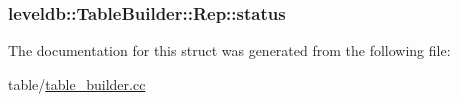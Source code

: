 \subsubsection[{status}]{ leveldb\+::\+Table\+Builder\+::\+Rep\+::status}\label{structleveldb_1_1_table_builder_1_1_rep_a8345f0a97587121457fb180a1fb081dd}


The documentation for this struct was generated from the following file\+:\begin{DoxyCompactItemize}
\item 
table/\hyperlink{table__builder_8cc}{table\+\_\+builder.\+cc}\end{DoxyCompactItemize}
